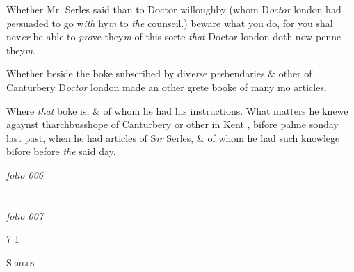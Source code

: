 \documentclass[12pt, a4paper]{book}
\begin{document}
            		
            			
		\ifthenelse{\isodd{\thepage}}
		{\reversemarginpar}
		{\normalmarginpar}
		Whether Mr. Serles said than to Doctor willoughby
 (whom D\textit{octor} london had \textit{per}suaded to go w\textit{ith} hy\textit{m} to \textit{the}
 counseil.) beware what you do, for you shal nev\textit{er}
 be able to \textit{pro}ve they\textit{m} of this sorte \textit{that} Doctor london doth
            			now penne they\textit{m}.
            		
			
				
		\ifthenelse{\isodd{\thepage}}
		{\reversemarginpar}
		{\normalmarginpar}
		Whether beside the boke subscribed by div\textit{er}se p\textit{re}bendaries
					\& other of Canturbery D\textit{octor} london made an other
	grete booke of many mo articles.
			
            		
            			
		\ifthenelse{\isodd{\thepage}}
		{\reversemarginpar}
		{\normalmarginpar}
		Where \textit{that} boke is, \& of whom he had his instructions. What matters he knewe agaynst tharchbusshope of Canturbery or other in Kent
			, bifore palme sonday last past, when he had articles of S\textit{ir} Serles, \& of whom he had such knowlege bifore before \textit{the} said day.
            		

\dotfill
						\newpage
{}

\textit{folio 006}
		
         		\vspace*{4cm}
         
      	
\dotfill
						  \section*{}  \subsection*{}

\textit{folio 007}



				\begin{flushright}{\color{Mahogany}7} 1\end{flushright}
            			
				\begin{center} \begin{large} {\scshape Serles} \end{large} \end{center}
			
\end{document}
